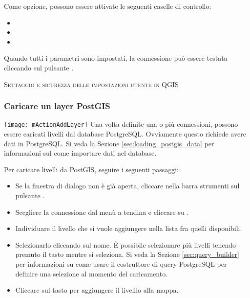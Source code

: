 Come opzione, possono essere attivate le seguenti caselle di controllo:

\begin{itemize}
\item {}
\item {}
\item {}
\end{itemize}

Quando tutti i parametri sono impostati, la connessione può essere testata
cliccando sul pulsante  .

\begin{Tip}\caption{\textsc{Settaggio e sicurezza delle impostazioni utente in QGIS}}
\end{Tip}

\subsubsection{Caricare un layer PostGIS}

\texttt{[image: mActionAddLayer]} Una volta definite una o più
connessioni, possono essere caricati livelli dal database PostgreSQL.
Ovviamente questo richiede avere dati in PostgreSQL. Si veda la Sezione
\ref{sec:loading_postgis_data} per informazioni sul come importare dati nel
database. 

Per caricare livelli da PostGIS, seguire i seguenti passaggi:

\begin{itemize}
\item Se la finestra di dialogo  non è già
aperta, cliccare nella barra strumenti sul pulsante
.
\item Scegliere la connessione dal menù a tendina e cliccare su .
\item Individuare il livello che si vuole aggiungere nella lista fra quelli disponibili.
\item Selezionarlo cliccando sul nome. È possibile selezionare più livelli
tenendo premuto il tasto  mentre si seleziona. Si veda la
Sezione \ref{sec:query_builder} per informazioni su come usare il costruttore
di query PostgreSQL per definire una selezione al momento del caricamento.
\item Cliccare sul tasto  per aggiungere il livelllo alla mappa.
\end{itemize}

